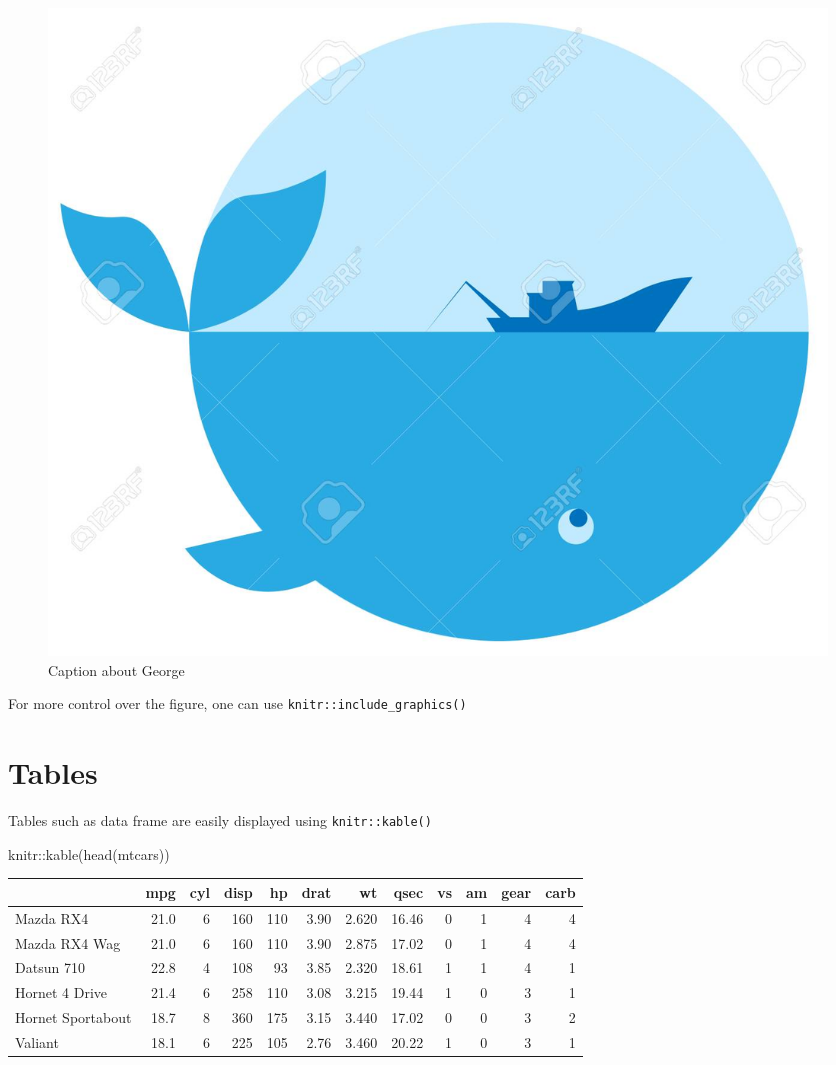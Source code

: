 \documentclass[
  11pt,
]{article}
\newenvironment{Shaded}{\begin{snugshade}}{\end{snugshade}}
\newcommand{\FunctionTok}[1]{\textcolor[rgb]{0.00,0.00,0.00}{#1}}
\newcommand{\NormalTok}[1]{#1}
\newcommand{\SpecialCharTok}[1]{\textcolor[rgb]{0.00,0.00,0.00}{#1}}
\begin{document}
\begin{figure}
\centering
\includegraphics{George.jpg}
\caption{Caption about George}
\end{figure}

For more control over the figure, one can use \texttt{knitr::include\_graphics()}

\newpage

\hypertarget{tables}{%
\section{Tables}\label{tables}}

Tables such as data frame are easily displayed using \texttt{knitr::kable()}

\begin{Shaded}
\begin{Highlighting}[]
\NormalTok{knitr}\SpecialCharTok{::}\FunctionTok{kable}\NormalTok{(}\FunctionTok{head}\NormalTok{(mtcars))}
\end{Highlighting}
\end{Shaded}

\begin{tabular}{l|r|r|r|r|r|r|r|r|r|r|r}
\hline
  & mpg & cyl & disp & hp & drat & wt & qsec & vs & am & gear & carb\\
\hline
Mazda RX4 & 21.0 & 6 & 160 & 110 & 3.90 & 2.620 & 16.46 & 0 & 1 & 4 & 4\\
\hline
Mazda RX4 Wag & 21.0 & 6 & 160 & 110 & 3.90 & 2.875 & 17.02 & 0 & 1 & 4 & 4\\
\hline
Datsun 710 & 22.8 & 4 & 108 & 93 & 3.85 & 2.320 & 18.61 & 1 & 1 & 4 & 1\\
\hline
Hornet 4 Drive & 21.4 & 6 & 258 & 110 & 3.08 & 3.215 & 19.44 & 1 & 0 & 3 & 1\\
\hline
Hornet Sportabout & 18.7 & 8 & 360 & 175 & 3.15 & 3.440 & 17.02 & 0 & 0 & 3 & 2\\
\hline
Valiant & 18.1 & 6 & 225 & 105 & 2.76 & 3.460 & 20.22 & 1 & 0 & 3 & 1\\
\hline
\end{tabular}
\end{document}
